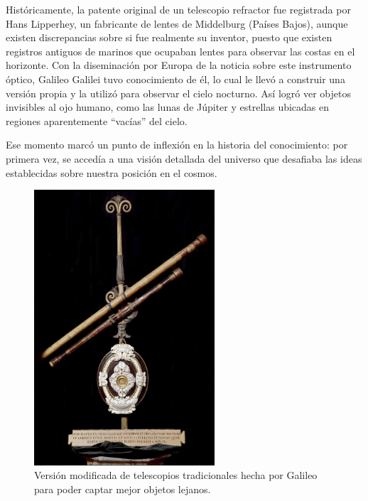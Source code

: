 Históricamente, la patente original de un telescopio refractor fue registrada por Hans Lipperhey, un fabricante de lentes de Middelburg (Países Bajos), aunque existen discrepancias sobre si fue realmente su inventor, puesto que existen registros antiguos de marinos que ocupaban lentes para observar las costas en el horizonte. Con la diseminación por Europa de la noticia sobre este instrumento óptico, Galileo Galilei tuvo conocimiento de él, lo cual le llevó a construir una versión propia y la utilizó para observar el cielo nocturno. Así logró ver objetos invisibles al ojo humano, como las lunas de Júpiter y estrellas ubicadas en regiones aparentemente “vacías” del cielo.

Ese momento marcó un punto de inflexión en la historia del conocimiento: por primera vez, se accedía a una visión detallada del universo que desafiaba las ideas establecidas sobre nuestra posición en el cosmos.

\begin{figure}[H]
	\centering
	\includegraphics[width=0.6\textwidth]{images/telescopio_galileo.jpg}
	\caption{Versión modificada de telescopios tradicionales hecha por Galileo para poder captar mejor objetos lejanos.}
	\label{fig:telescopio_patente_galileo}
\end{figure}

